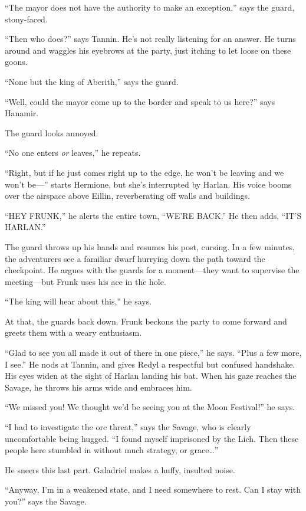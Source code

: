 \documentclass[smalldemyvopaper,11pt,twoside,onecolumn,openright,extrafontsizes]{memoir}
\begin{document}
``The mayor does not have the authority to make an exception,'' says the
guard, stony-faced.

``Then who does?'' says Tannin. He's not really listening for an answer.
He turns around and waggles his eyebrows at the party, just itching to
let loose on these goons.

``None but the king of Aberith,'' says the guard.

``Well, could the mayor come up to the border and speak to us here?''
says Hanamir.

The guard looks annoyed.

``No one enters \emph{or} leaves,'' he repeats.

``Right, but if he just comes right up to the edge, he won't be leaving
and we won't be---'' starts Hermione, but she's interrupted by Harlan.
His voice booms over the airspace above Eillin, reverberating off walls
and buildings.

``HEY FRUNK,'' he alerts the entire town, ``WE'RE BACK.'' He then adds,
``IT'S HARLAN.''

The guard throws up his hands and resumes his post, cursing. In a few
minutes, the adventurers see a familiar dwarf hurrying down the path
toward the checkpoint. He argues with the guards for a moment---they
want to supervise the meeting---but Frunk uses his ace in the hole.

``The king will hear about this,'' he says.

At that, the guards back down. Frunk beckons the party to come forward
and greets them with a weary enthusiasm.

``Glad to see you all made it out of there in one piece,'' he says.
``Plus a few more, I see.'' He nods at Tannin, and gives Redyl a
respectful but confused handshake. His eyes widen at the sight of Harlan
landing his bat. When his gaze reaches the Savage, he throws his arms
wide and embraces him.

``We missed you! We thought we'd be seeing you at the Moon Festival!''
he says.

``I had to investigate the orc threat,'' says the Savage, who is clearly
uncomfortable being hugged. ``I found myself imprisoned by the Lich.
Then these people here stumbled in without much strategy, or
grace\ldots{}''

He sneers this last part. Galadriel makes a huffy, insulted noise.

``Anyway, I'm in a weakened state, and I need somewhere to rest. Can I
stay with you?'' says the Savage.
\end{document}
